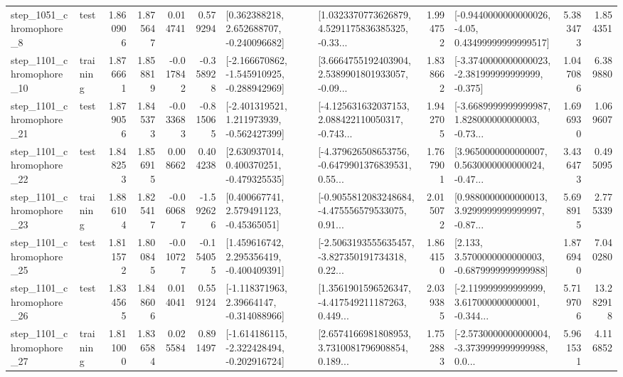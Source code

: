 \begin{tabular}{llrrrrllrlrr}
  step\_1051\_chromophore\_8 &      test &      1.860906 &    1.875647 &      0.014741 &  0.579294 &    [0.362388218, 2.652688707, -0.240096682] &  [1.0323370773626879, 4.5291175836385325, -0.33... &       1.994752 &  [-0.9440000000000026, -4.05, 0.43499999999999517] &            5.383473 &          1.854351 \\
 step\_1101\_chromophore\_10 &  training &      1.876661 &    1.858819 &     -0.017842 & -0.358928 &  [-2.166670862, -1.545910925, -0.288942969] &  [3.6664755192403904, 2.5389901801933057, -0.09... &       1.838662 &  [-3.3740000000000023, -2.381999999999999, -0.375] &            1.047086 &          6.389880 \\
 step\_1101\_chromophore\_21 &      test &      1.879056 &    1.845373 &     -0.033683 & -0.815065 &   [-2.401319521, 1.211973939, -0.562427399] &  [-4.125631632037153, 2.088422110050317, -0.743... &       1.942705 &  [-3.6689999999999987, 1.828000000000003, -0.73... &            1.696930 &          1.069607 \\
 step\_1101\_chromophore\_22 &      test &      1.848253 &    1.856915 &      0.008662 &  0.404238 &    [2.630937014, 0.400370251, -0.479325535] &  [-4.379626508653756, -0.6479901376839531, 0.55... &       1.767901 &  [3.9650000000000007, 0.5630000000000024, -0.47... &            3.436473 &          0.495095 \\
 step\_1101\_chromophore\_23 &  training &      1.886104 &    1.825417 &     -0.060687 & -1.592626 &     [0.400667741, 2.579491123, -0.45365051] &  [-0.9055812083248684, -4.475556579533075, 0.91... &       2.015072 &  [0.9880000000000013, 3.9299999999999997, -0.87... &            5.698915 &          2.775339 \\
 step\_1101\_chromophore\_25 &      test &      1.811572 &    1.800845 &     -0.010727 & -0.154055 &    [1.459616742, 2.295356419, -0.400409391] &  [-2.5063193555635457, -3.827350191734318, 0.22... &       1.864150 &   [2.133, 3.5700000000000003, -0.6879999999999988] &            1.876940 &          7.040280 \\
 step\_1101\_chromophore\_26 &      test &      1.834565 &    1.848606 &      0.014041 &  0.559124 &    [-1.118371963, 2.39664147, -0.314088966] &  [1.3561901596526347, -4.417549211187263, 0.449... &       2.039385 &  [-2.119999999999999, 3.617000000000001, -0.344... &            5.719706 &         13.282918 \\
 step\_1101\_chromophore\_27 &  training &      1.811000 &    1.836584 &      0.025584 &  0.891497 &  [-1.614186115, -2.322428494, -0.202916724] &  [2.6574166981808953, 3.7310081796908854, 0.189... &       1.752883 &  [-2.5730000000000004, -3.3739999999999988, 0.0... &            5.961531 &          4.116852 \\

\end{tabular}
